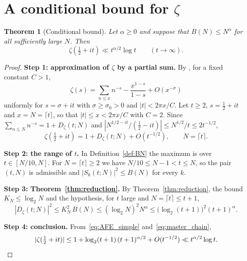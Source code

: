 \documentclass[11pt]{amsart}
\newtheorem{theorem}{Theorem}[section]
\theoremstyle{definition}
\theoremstyle{remark}
\newcommand{\half}{\tfrac{1}{2}}
\begin{document}
\section{A conditional bound for \texorpdfstring{$\zeta$}{zeta}}\label{sec:thm5}

\begin{theorem}[Conditional bound]\label{thm:master}
Let $\alpha\ge0$ and suppose that $B(N) \le N^\alpha$ for all sufficiently
large $N$.  Then
\begin{equation}\label{eq:master}
  \zeta(\half + it) \ll t^{\alpha/2}\log t\qquad(t\to\infty).
\end{equation}
\end{theorem}

\begin{proof}
\noindent\textbf{Step 1: approximation of $\zeta$ by a partial sum.}
By \cite[Theorem~4.11]{titchmarsh1986}, for a fixed constant $C>1$,
\begin{equation}\label{eq:AFE}
  \zeta(s) = \sum_{n \le x} n^{-s}-\frac{x^{1-s}}{1-s} + O(x^{-\sigma})
\end{equation}
uniformly for $s=\sigma+it$ with $\sigma\ge\sigma_0>0$ and
$|t|<2\pi x/C$.  Let $t\ge2$, $s=\half+it$ and $x=N=\lceil t\rceil$, so
that $|t|\le x<2\pi x/C$ with $C=2$.  Since $\sum_{n\le N}n^{-s}=1+D_\zeta(t;N)$ and
$|N^{1/2-it}/(\half-it)|\le N^{1/2}/t\le 2t^{-1/2}$,
\begin{equation}\label{eq:AFE_simple}
  \zeta(\half+it) = 1+D_\zeta(t;N) + O(t^{-1/2}),\qquad N=\lceil t\rceil.
\end{equation}

\medskip
\noindent\textbf{Step 2: the range of $t$.}
In Definition~\ref{def:BN} the maximum is over $t \in [N/10, N]$.  For
$N=\lceil t\rceil\ge2$ we have $N/10\le N-1<t\le N$, so the pair $(t,N)$
is admissible and $|S_k(t;N)|^2\le B(N)$ for every $k$.

\medskip
\noindent\textbf{Step 3: Theorem~\ref{thm:reduction}.}
By Theorem~\ref{thm:reduction}, the bound $K_N\le\log_2N$ and the
hypothesis, for $t$ large and $N=\lceil t\rceil\le t+1$,
\begin{equation}\label{eq:master_chain}
  |D_\zeta(t;N)|^2 \le K_N^2 \, B(N) \le (\log_2 N)^2 N^\alpha
  \le \bigl(\log_2 (t+1)\bigr)^2 (t+1)^{\alpha}.
\end{equation}

\medskip
\noindent\textbf{Step 4: conclusion.}
From~\eqref{eq:AFE_simple} and~\eqref{eq:master_chain},
\[
  |\zeta(\half+it)|\le 1+\log_2(t+1)\,(t+1)^{\alpha/2}+O(t^{-1/2})
  \ll t^{\alpha/2}\log t .\qedhere
\]
\end{proof}
\end{document}
